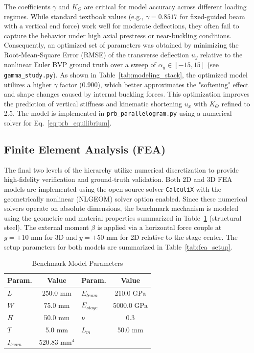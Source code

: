 \documentclass[colorlinks,upint,subscriptcorrection,varvw,hyphenate,balance]{asmeconf} %
\begin{document}
The coefficients $\gamma$ and $K_\Theta$ are critical for model accuracy across different loading regimes. While standard textbook values (e.g., $\gamma=0.8517$ for fixed-guided beam with a vertical end force) work well for moderate deflections, they often fail to capture the behavior under high axial prestress or near-buckling conditions. Consequently, an optimized set of parameters was obtained by minimizing the Root-Mean-Square Error (RMSE) of the transverse deflection $u_y$ relative to the nonlinear Euler BVP ground truth over a sweep of $\alpha_y \in [-15, 15]$ (see \texttt{gamma\_study.py}). As shown in Table~\ref{tab:modeling_stack}, the optimized model utilizes a higher $\gamma$ factor (0.900), which better approximates the "softening" effect and shape changes caused by internal buckling forces. This optimization improves the prediction of vertical stiffness and kinematic shortening $u_x$ with $K_\Theta$ refined to 2.5. The model is implemented in \texttt{prb\_parallelogram.py} using a numerical solver for Eq.~\eqref{eq:prb_equilibrium}.


\subsection{Finite Element Analysis (FEA)}
\label{sec:fea}
The final two levels of the hierarchy utilize numerical discretization to provide high-fidelity verification and ground-truth validation. Both 2D and 3D FEA models are implemented using the open-source solver \texttt{CalculiX} with the geometrically nonlinear (NLGEOM) solver option enabled. Since these numerical solvers operate on absolute dimensions, the benchmark mechanism is modeled using the geometric and material properties summarized in Table~\ref{tab:model_params} (structural steel). The external moment $\beta$ is applied via a horizontal force couple at $y = \pm 10\text{ mm}$ for 3D and $y = \pm 50\text{ mm}$ for 2D relative to the stage center. The setup parameters for both models are summarized in Table~\ref{tab:fea_setup}.

\begin{table}[ht]
\centering
\caption{Benchmark Model Parameters}
\label{tab:model_params}
\begin{tabular}{lc|lc}
\toprule
\textbf{Param.} & \textbf{Value} & \textbf{Param.} & \textbf{Value} \\
\midrule
$L$ & 250.0 mm & $E_{beam}$ & 210.0 GPa \\
$W$ & 75.0 mm & $E_{stage}$ & 5000.0 GPa \\
$H$ & 50.0 mm & $\nu$ & 0.3 \\
$T$ & 5.0 mm & $L_{m}$ & 50.0 mm \\
$I_{beam}$ & $520.83 \text{ mm}^4$ & & \\
\bottomrule
\end{tabular}
\end{table}
\end{document}

